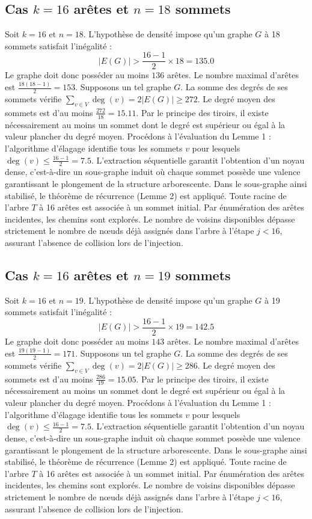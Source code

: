 \documentclass[12pt,a4paper]{article}
\begin{document}
\subsection{Cas $k = 16$ arêtes et $n = 18$ sommets}
Soit $k = 16$ et $n = 18$. L'hypothèse de densité impose qu'un graphe $G$ à 18 sommets satisfait l'inégalité :
$$ |E(G)| > \frac{16-1}{2} \times 18 = 135.0 $$
Le graphe doit donc posséder au moins $136$ arêtes. Le nombre maximal d'arêtes est $\frac{18(18-1)}{2} = 153$.
Supposons un tel graphe $G$. La somme des degrés de ses sommets vérifie $\sum_{v \in V} \deg(v) = 2|E(G)| \geq 272$.
Le degré moyen des sommets est d'au moins $\frac{272}{18} = 15.11$.
Par le principe des tiroirs, il existe nécessairement au moins un sommet dont le degré est supérieur ou égal à la valeur plancher du degré moyen.
Procédons à l'évaluation du Lemme 1 : l'algorithme d'élagage identifie tous les sommets $v$ pour lesquels $\deg(v) \leq \frac{16-1}{2} = 7.5$.
L'extraction séquentielle garantit l'obtention d'un noyau dense, c'est-à-dire un sous-graphe induit où chaque sommet possède une valence garantissant le plongement de la structure arborescente.
Dans le sous-graphe ainsi stabilisé, le théorème de récurrence (Lemme 2) est appliqué. Toute racine de l'arbre $T$ à 16 arêtes est associée à un sommet initial. Par énumération des arêtes incidentes, les chemins sont explorés. Le nombre de voisins disponibles dépasse strictement le nombre de nœuds déjà assignés dans l'arbre à l'étape $j < 16$, assurant l'absence de collision lors de l'injection.

\subsection{Cas $k = 16$ arêtes et $n = 19$ sommets}
Soit $k = 16$ et $n = 19$. L'hypothèse de densité impose qu'un graphe $G$ à 19 sommets satisfait l'inégalité :
$$ |E(G)| > \frac{16-1}{2} \times 19 = 142.5 $$
Le graphe doit donc posséder au moins $143$ arêtes. Le nombre maximal d'arêtes est $\frac{19(19-1)}{2} = 171$.
Supposons un tel graphe $G$. La somme des degrés de ses sommets vérifie $\sum_{v \in V} \deg(v) = 2|E(G)| \geq 286$.
Le degré moyen des sommets est d'au moins $\frac{286}{19} = 15.05$.
Par le principe des tiroirs, il existe nécessairement au moins un sommet dont le degré est supérieur ou égal à la valeur plancher du degré moyen.
Procédons à l'évaluation du Lemme 1 : l'algorithme d'élagage identifie tous les sommets $v$ pour lesquels $\deg(v) \leq \frac{16-1}{2} = 7.5$.
L'extraction séquentielle garantit l'obtention d'un noyau dense, c'est-à-dire un sous-graphe induit où chaque sommet possède une valence garantissant le plongement de la structure arborescente.
Dans le sous-graphe ainsi stabilisé, le théorème de récurrence (Lemme 2) est appliqué. Toute racine de l'arbre $T$ à 16 arêtes est associée à un sommet initial. Par énumération des arêtes incidentes, les chemins sont explorés. Le nombre de voisins disponibles dépasse strictement le nombre de nœuds déjà assignés dans l'arbre à l'étape $j < 16$, assurant l'absence de collision lors de l'injection.
\end{document}
